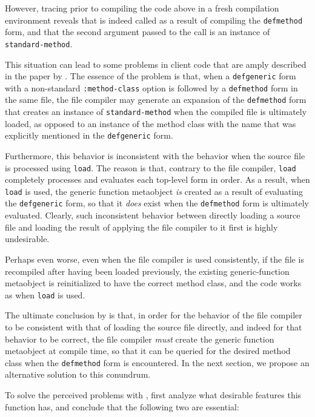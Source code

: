 However, tracing \mml{} prior to compiling the code above in a fresh
compilation environment reveals that 
\mml{} is indeed called as a
result of compiling the \texttt{defmethod} form, and that the second
argument passed to the call is an instance of
\texttt{standard-method}.

This situation can lead to some problems in client code that are amply
described in the paper by \cnh{}.  The essence of the
problem is that, when a \texttt{defgeneric} form with a
non-standard \texttt{:method-class} option is followed by a
\texttt{defmethod} form in the same file, the file compiler may
generate an expansion of the \texttt{defmethod} form that creates an
instance of \texttt{standard-method} when the compiled file is
ultimately loaded, as opposed to an instance of the method class with
the name that was explicitly mentioned in the \texttt{defgeneric}
form.

Furthermore, this behavior is inconsistent with the behavior when the
source file is processed using \texttt{load}.  The reason is that,
contrary to the file compiler, \texttt{load} completely processes and
evaluates each top-level form in order.  As a result, when
\texttt{load} is used, the generic function metaobject \emph{is}
created as a result of evaluating the \texttt{defgeneric} form, so
that it \emph{does} exist when the \texttt{defmethod} form is
ultimately evaluated.  Clearly, such inconsistent behavior between
directly loading a source file and loading the result of applying the
file compiler to it first is highly undesirable.

Perhaps even worse, even when the file compiler is used consistently,
if the file is recompiled after having been loaded previously, the
existing generic-function metaobject is reinitialized to have the
correct method class, and the code works as when \texttt{load} is
used.

The ultimate conclusion by \cnh{} is that, in order for
the behavior of the file compiler to be consistent with that of
loading the source file directly, and indeed for that behavior to be
correct, the file compiler \emph{must} create the generic function
metaobject at compile time, so that it can be queried for the desired
method class when the \texttt{defmethod} form is encountered.  In the
next section, we propose an alternative solution to this conundrum.

To solve the perceived problems with \mml{}, \cnh{} first analyze what
desirable features this function has, and conclude that the following
two are essential:

